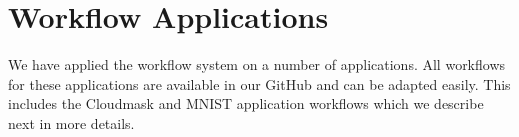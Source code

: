 
\section{Workflow Applications}

We have applied the workflow system on a number of applications. All workflows for these applications are available in our GitHub and can be adapted easily.
This includes the Cloudmask and MNIST application workflows which we describe next in more details.


